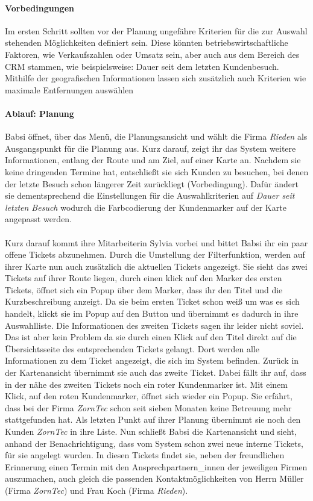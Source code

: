 \documentclass[Bachelorarbeit.tex]{subfiles}
\begin{document}
\paragraph*{Vorbedingungen}
Im ersten Schritt sollten vor der Planung ungefähre Kriterien für die zur Auswahl stehenden Möglichkeiten definiert sein.
Diese könnten betriebswirtschaftliche Faktoren, wie Verkaufszahlen oder Umsatz sein, aber auch aus dem Bereich des \ac{CRM} stammen, wie beispielsweise: Dauer seit dem letzten Kundenbesuch.
Mithilfe der geografischen Informationen lassen sich zusätzlich auch Kriterien wie maximale Entfernungen auswählen

\paragraph*{Ablauf: Planung}
Babsi öffnet, über das Menü, die Planungsansicht und wählt die Firma \textit{Rieden} als Ausgangspunkt für die Planung aus.
Kurz darauf, zeigt ihr das System weitere Informationen, entlang der Route und am Ziel, auf einer Karte an.
Nachdem sie keine dringenden Termine hat, entschließt sie sich Kunden zu besuchen, bei denen der letzte Besuch schon längerer Zeit zurückliegt (Vorbedingung).
Dafür ändert sie dementsprechend die Einstellungen für die Auswahlkriterien auf \textit{Dauer seit letzten Besuch} wodurch die Farbcodierung der Kundenmarker auf der Karte angepasst werden.\\
\\
Kurz darauf kommt ihre Mitarbeiterin Sylvia vorbei und bittet Babsi ihr ein paar offene Tickets abzunehmen. 
Durch die Umstellung der Filterfunktion, werden auf ihrer Karte nun auch zusätzlich die aktuellen Tickets angezeigt.
Sie sieht das zwei Tickets auf ihrer Route liegen, durch einen klick auf den Marker des ersten Tickets, öffnet sich ein Popup über dem Marker, dass ihr den Titel und die Kurzbeschreibung anzeigt. 
Da sie beim ersten Ticket schon weiß um was es sich handelt, klickt sie im Popup auf den Button und übernimmt es dadurch in ihre Auswahlliste.
Die Informationen des zweiten Tickets sagen ihr leider nicht soviel. 
Das ist aber kein Problem da sie durch einen Klick auf den Titel direkt auf die Übersichtsseite des entsprechenden Tickets gelangt.
Dort werden alle Informationen zu dem Ticket angezeigt, die sich im System befinden.
Zurück in der Kartenansicht übernimmt sie auch das zweite Ticket. 
Dabei fällt ihr auf, dass in der nähe des zweiten Tickets noch ein roter Kundenmarker ist.
Mit einem Klick, auf den roten Kundenmarker, öffnet sich wieder ein Popup.
Sie erfährt, dass bei der Firma \textit{ZornTec} schon seit sieben Monaten keine Betreuung mehr stattgefunden hat.
Als letzten Punkt auf ihrer Planung übernimmt sie noch den Kunden \textit{ZornTec} in ihre Liste. 
Nun schließt Babsi die Kartenansicht und sieht, anhand der Benachrichtigung, dass vom System schon zwei neue interne Tickets, für sie angelegt wurden.
In diesen Tickets findet sie, neben der freundlichen Erinnerung einen Termin mit den Ansprechpartnern\_innen der jeweiligen Firmen auszumachen, auch gleich die passenden Kontaktmöglichkeiten von Herrn Müller (Firma \textit{ZornTec}) und Frau Koch (Firma \textit{Rieden}).
\end{document}
